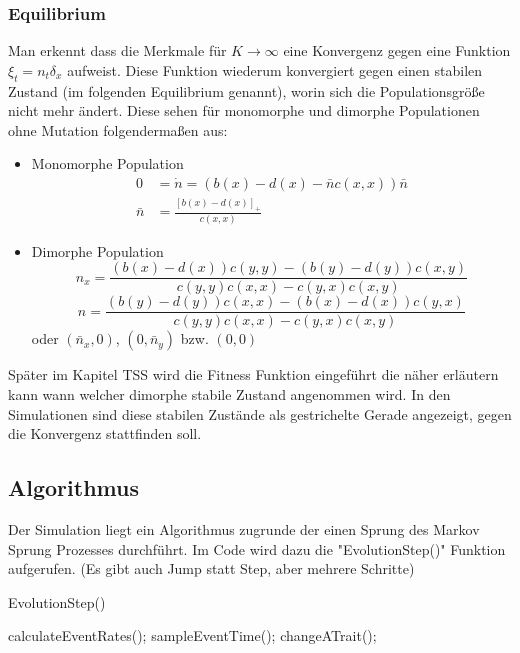 \documentclass{article}
\begin{document}
		
		\subsubsection{Equilibrium}
		Man erkennt dass die Merkmale für $ K \to \infty $ eine Konvergenz gegen eine Funktion $ \xi_t = n_t \delta_x $ aufweist. Diese Funktion wiederum konvergiert gegen einen stabilen Zustand (im folgenden Equilibrium genannt), worin sich die Populationsgröße nicht mehr ändert. Diese sehen für monomorphe und dimorphe Populationen ohne Mutation folgendermaßen aus:
		\begin{itemize}
			\item Monomorphe Population\\
				\begin{align*}
				0 & = \dot{n} = (b(x) - d(x) - \bar{n}c(x,x))\bar{n}\\
				\bar{n} &= \frac{\left[ b(x)-d(x) \right]_+}{c(x,x)}
				\end{align*}
			\item Dimorphe Population\\
				\[ n_x = \frac{(b(x) - d(x))c(y,y)-(b(y)-d(y))c(x,y)}{c(y,y)c(x,x) - c(y,x)c(x,y)} \]
				\[ n = \frac{(b(y) - d(y))c(x,x)-(b(x)-d(x))c(y,x)}{c(y,y)c(x,x) - c(y,x)c(x,y)} \]
				oder $ (\bar{n}_x, 0)$, $ (0, \bar{n}_y)$ bzw. $ (0,0) $
		\end{itemize}
		Später im Kapitel TSS wird die Fitness Funktion eingeführt die näher erläutern kann wann welcher dimorphe stabile Zustand angenommen wird.
		In den Simulationen sind diese stabilen Zustände als gestrichelte Gerade angezeigt, gegen die Konvergenz stattfinden soll.
		
		
		
	\subsection{Algorithmus}
	Der Simulation liegt ein Algorithmus zugrunde der einen Sprung des Markov Sprung Prozesses durchführt. Im Code wird dazu die "{}EvolutionStep()"{} Funktion aufgerufen. (Es gibt auch Jump statt Step, aber mehrere Schritte)
	\begin{algorithm}[H]
		\caption{EvolutionStep()}
		\begin{algorithmic}[1]
			\STATE calculateEventRates();
			\STATE sampleEventTime();
			\STATE changeATrait();
		\end{algorithmic}
	\end{algorithm}
	
\end{document}
